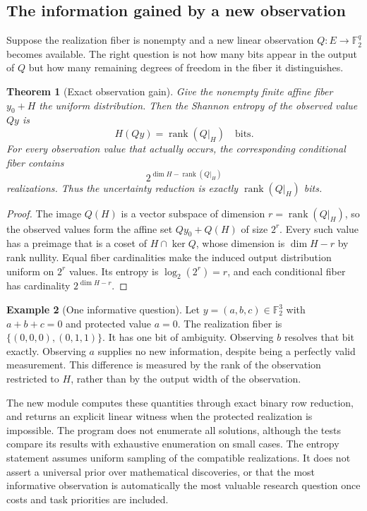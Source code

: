 \documentclass[11pt,oneside]{article}
\newtheorem{theorem}{Theorem}[section]
\theoremstyle{definition}
\newtheorem{example}[theorem]{Example}
\theoremstyle{remark}
\begin{document}
\subsection{The information gained by a new observation}

Suppose the realization fiber is nonempty and a new linear observation $Q:E\to\mathbb F_2^q$ becomes available. The right question is not how many bits appear in the output of $Q$ but how many remaining degrees of freedom in the fiber it distinguishes.

\begin{theorem}[Exact observation gain]
Give the nonempty finite affine fiber $y_0+H$ the uniform distribution. Then the Shannon entropy of the observed value $Qy$ is
\[
H(Qy)=\operatorname{rank}(Q|_H)\quad\text{bits}.
\]
For every observation value that actually occurs, the corresponding conditional fiber contains
\[
2^{\dim H-\operatorname{rank}(Q|_H)}
\]
realizations. Thus the uncertainty reduction is exactly $\operatorname{rank}(Q|_H)$ bits.
\end{theorem}
\begin{proof}
The image $Q(H)$ is a vector subspace of dimension $r=\operatorname{rank}(Q|_H)$, so the observed values form the affine set $Qy_0+Q(H)$ of size $2^r$. Every such value has a preimage that is a coset of $H\cap\ker Q$, whose dimension is $\dim H-r$ by rank nullity. Equal fiber cardinalities make the induced output distribution uniform on $2^r$ values. Its entropy is $\log_2(2^r)=r$, and each conditional fiber has cardinality $2^{\dim H-r}$.
\end{proof}

\begin{example}[One informative question]
Let $y=(a,b,c)\in\mathbb F_2^3$ with $a+b+c=0$ and protected value $a=0$. The realization fiber is $\{(0,0,0),(0,1,1)\}$. It has one bit of ambiguity. Observing $b$ resolves that bit exactly. Observing $a$ supplies no new information, despite being a perfectly valid measurement. This difference is measured by the rank of the observation restricted to $H$, rather than by the output width of the observation.
\end{example}

The new module  computes these quantities through exact binary row reduction, and returns an explicit linear witness when the protected realization is impossible. The program does not enumerate all solutions, although the tests compare its results with exhaustive enumeration on small cases. The entropy statement assumes uniform sampling of the compatible realizations. It does not assert a universal prior over mathematical discoveries, or that the most informative observation is automatically the most valuable research question once costs and task priorities are included.
\end{document}

